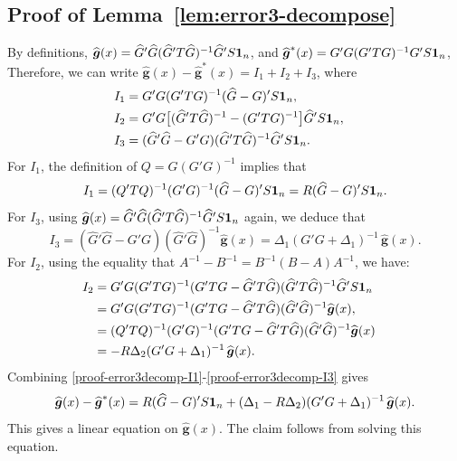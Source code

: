 \documentclass[preprint,11pt]{article}
\newcommand{\bg}{{\boldsymbol g}}
\numberwithin{equation}{section}
\newcommand{\beq}{\begin{equation}}
\newcommand{\eeq}{\end{equation}}
\begin{document}
\subsection{Proof of Lemma~\ref{lem:error3-decompose}}
By definitions, $\widehat{\bg}(x)=\widehat{G}'\widehat{G}(\widehat{G}'T\widehat{G})^{-1}\widehat{G}'S{\bf 1}_n$, and $\widehat{\bg}^*(x)=G'G(G'TG)^{-1}G'S{\bf 1}_n$, 
Therefore, we can write $\widehat{\boldsymbol g}(x) - \widehat{\bg}^*(x) =I_1 + I_2 + I_3$, where
\begin{align*}
I_1 & = G'G(G'TG)^{-1}(\widehat{G}-G)'S{\bf 1}_n,\cr
I_2 &= G'G\bigl[(\widehat{G}'T\widehat{G})^{-1} - (G'TG)^{-1}\bigr]\widehat{G}'S{\bf 1}_n,\cr
I_3 &= (\widehat{G}'\widehat{G}- G'G) (\widehat{G}'T\widehat{G})^{-1}\widehat{G}'S{\bf 1}_n. 
\end{align*}
For $I_1$, the definition of $Q=G(G'G)^{-1}$ implies that 
\beq \label{proof-error3decomp-I1}
I_1 =(Q'TQ)^{-1}(G'G)^{-1}(\widehat{G}-G)'S{\bf 1}_n = R(\widehat{G}-G)'S{\bf 1}_n.  
\eeq
For $I_3$, using $\widehat{\bg}(x) = \widehat{G}'\widehat{G}(\widehat{G}'T\widehat{G})^{-1}\widehat{G}'S{\bf 1}_n$ again, we deduce that 
\beq \label{proof-error3decomp-I3}
I_3 = (\widehat{G}'\widehat{G}- G'G)(\widehat{G}'\widehat{G})^{-1} \widehat{\bg}(x)=\Delta_1(G'G+\Delta_1)^{-1}\,\widehat{\bg}(x). 
\eeq
For $I_2$, using the equality that $A^{-1}-B^{-1}=B^{-1}(B-A)A^{-1}$, we have:
\begin{align} \label{proof-error3decomp-I2}
I_2 &= G'G(G'TG)^{-1}(G'TG-\widehat{G}'T\widehat{G})(\widehat{G}'T\widehat{G})^{-1}\widehat{G}'S{\bf 1}_n \cr
& =  G'G(G'TG)^{-1}(G'TG-\widehat{G}'T\widehat{G})(\widehat{G}'\widehat{G})^{-1}\widehat{\bg}(x),\cr
&= (Q'TQ)^{-1}(G'G)^{-1}(G'TG-\widehat{G}'T\widehat{G})(\widehat{G}'\widehat{G})^{-1} \widehat{\bg}(x)\cr
&= - R \Delta_2 (G'G+\Delta_1)^{-1}\,  \widehat{\bg}(x). 
\end{align}
Combining \eqref{proof-error3decomp-I1}-\eqref{proof-error3decomp-I3} gives 
\[
\widehat{\boldsymbol g}(x) - \widehat{\bg}^*(x)  = R(\widehat{G}-G)'S{\bf 1}_n + (\Delta_1-R\Delta_2  )(G'G+\Delta_1)^{-1}\,\widehat{\bg}(x). 
\]
This gives a linear equation on $\widehat{\bg}(x)$. The claim follows from solving this equation. 
\end{document}
